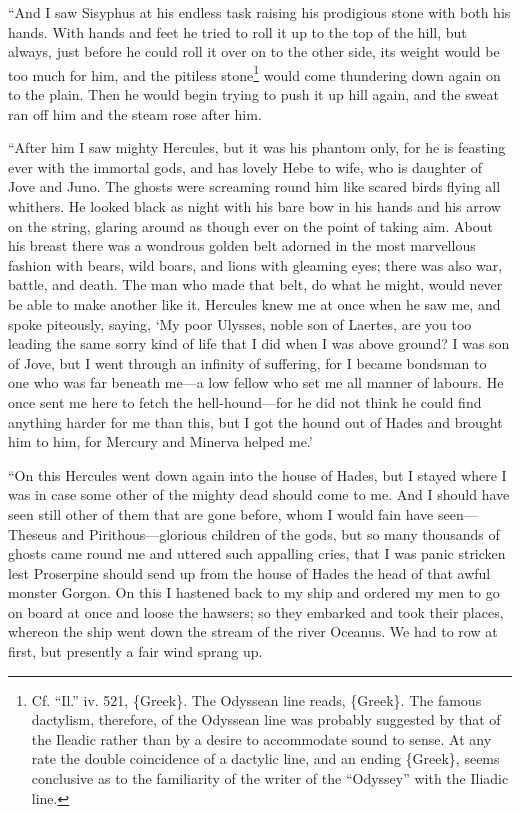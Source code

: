 “And I saw Sisyphus at his endless task raising his prodigious stone with both
his hands. With hands and feet he tried to roll it up to the top of the hill,
but always, just before he could roll it over on to the other side, its weight
would be too much for him, and the pitiless stone\footnote{Cf. “Il.” iv. 521, \{Greek\}. The Odyssean line reads, \{Greek\}. The famous
dactylism, therefore, of the Odyssean line was probably suggested by that of
the Ileadic rather than by a desire to accommodate sound to sense. At any rate
the double coincidence of a dactylic line, and an ending \{Greek\}, seems
conclusive as to the familiarity of the writer of the “Odyssey” with the
Iliadic line.} would come thundering down again on
to the plain. Then he would begin trying to push it up hill again, and the
sweat ran off him and the steam rose after him.

“After him I saw mighty Hercules, but it was his phantom only, for he is
feasting ever with the immortal gods, and has lovely Hebe to wife, who is
daughter of Jove and Juno. The ghosts were screaming round him like scared
birds flying all whithers. He looked black as night with his bare bow in his
hands and his arrow on the string, glaring around as though ever on the point
of taking aim. About his breast there was a wondrous golden belt adorned in the
most marvellous fashion with bears, wild boars, and lions with gleaming eyes;
there was also war, battle, and death. The man who made that belt, do what he
might, would never be able to make another like it. Hercules knew me at once
when he saw me, and spoke piteously, saying, ‘My poor Ulysses, noble son of
Laertes, are you too leading the same sorry kind of life that I did when I was
above ground? I was son of Jove, but I went through an infinity of suffering,
for I became bondsman to one who was far beneath me—a low fellow who set me all
manner of labours. He once sent me here to fetch the hell-hound—for he did not
think he could find anything harder for me than this, but I got the hound out
of Hades and brought him to him, for Mercury and Minerva helped me.’

“On this Hercules went down again into the house of Hades, but I stayed where I
was in case some other of the mighty dead should come to me. And I should have
seen still other of them that are gone before, whom I would fain have
seen—Theseus and Pirithous—glorious children of the gods, but so many thousands
of ghosts came round me and uttered such appalling cries, that I was panic
stricken lest Proserpine should send up from the house of Hades the head of
that awful monster Gorgon. On this I hastened back to my ship and ordered my
men to go on board at once and loose the hawsers; so they embarked and took
their places, whereon the ship went down the stream of the river Oceanus. We
had to row at first, but presently a fair wind sprang up.

